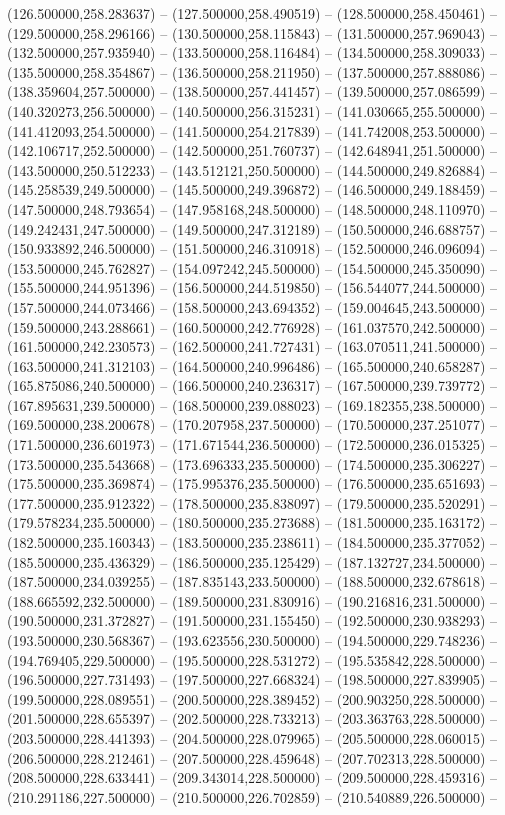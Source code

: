 (126.500000,258.283637) -- (127.500000,258.490519) -- (128.500000,258.450461) -- (129.500000,258.296166) -- (130.500000,258.115843) -- (131.500000,257.969043) -- (132.500000,257.935940) -- (133.500000,258.116484) -- (134.500000,258.309033) -- (135.500000,258.354867) -- (136.500000,258.211950) -- (137.500000,257.888086) -- (138.359604,257.500000) -- (138.500000,257.441457) -- (139.500000,257.086599) -- (140.320273,256.500000) -- (140.500000,256.315231) -- (141.030665,255.500000) -- (141.412093,254.500000) -- (141.500000,254.217839) -- (141.742008,253.500000) -- (142.106717,252.500000) -- (142.500000,251.760737) -- (142.648941,251.500000) -- (143.500000,250.512233) -- (143.512121,250.500000) -- (144.500000,249.826884) -- (145.258539,249.500000) -- (145.500000,249.396872) -- (146.500000,249.188459) -- (147.500000,248.793654) -- (147.958168,248.500000) -- (148.500000,248.110970) -- (149.242431,247.500000) -- (149.500000,247.312189) -- (150.500000,246.688757) -- (150.933892,246.500000) -- (151.500000,246.310918) -- (152.500000,246.096094) -- (153.500000,245.762827) -- (154.097242,245.500000) -- (154.500000,245.350090) -- (155.500000,244.951396) -- (156.500000,244.519850) -- (156.544077,244.500000) -- (157.500000,244.073466) -- (158.500000,243.694352) -- (159.004645,243.500000) -- (159.500000,243.288661) -- (160.500000,242.776928) -- (161.037570,242.500000) -- (161.500000,242.230573) -- (162.500000,241.727431) -- (163.070511,241.500000) -- (163.500000,241.312103) -- (164.500000,240.996486) -- (165.500000,240.658287) -- (165.875086,240.500000) -- (166.500000,240.236317) -- (167.500000,239.739772) -- (167.895631,239.500000) -- (168.500000,239.088023) -- (169.182355,238.500000) -- (169.500000,238.200678) -- (170.207958,237.500000) -- (170.500000,237.251077) -- (171.500000,236.601973) -- (171.671544,236.500000) -- (172.500000,236.015325) -- (173.500000,235.543668) -- (173.696333,235.500000) -- (174.500000,235.306227) -- (175.500000,235.369874) -- (175.995376,235.500000) -- (176.500000,235.651693) -- (177.500000,235.912322) -- (178.500000,235.838097) -- (179.500000,235.520291) -- (179.578234,235.500000) -- (180.500000,235.273688) -- (181.500000,235.163172) -- (182.500000,235.160343) -- (183.500000,235.238611) -- (184.500000,235.377052) -- (185.500000,235.436329) -- (186.500000,235.125429) -- (187.132727,234.500000) -- (187.500000,234.039255) -- (187.835143,233.500000) -- (188.500000,232.678618) -- (188.665592,232.500000) -- (189.500000,231.830916) -- (190.216816,231.500000) -- (190.500000,231.372827) -- (191.500000,231.155450) -- (192.500000,230.938293) -- (193.500000,230.568367) -- (193.623556,230.500000) -- (194.500000,229.748236) -- (194.769405,229.500000) -- (195.500000,228.531272) -- (195.535842,228.500000) -- (196.500000,227.731493) -- (197.500000,227.668324) -- (198.500000,227.839905) -- (199.500000,228.089551) -- (200.500000,228.389452) -- (200.903250,228.500000) -- (201.500000,228.655397) -- (202.500000,228.733213) -- (203.363763,228.500000) -- (203.500000,228.441393) -- (204.500000,228.079965) -- (205.500000,228.060015) -- (206.500000,228.212461) -- (207.500000,228.459648) -- (207.702313,228.500000) -- (208.500000,228.633441) -- (209.343014,228.500000) -- (209.500000,228.459316) -- (210.291186,227.500000) -- (210.500000,226.702859) -- (210.540889,226.500000) -- 